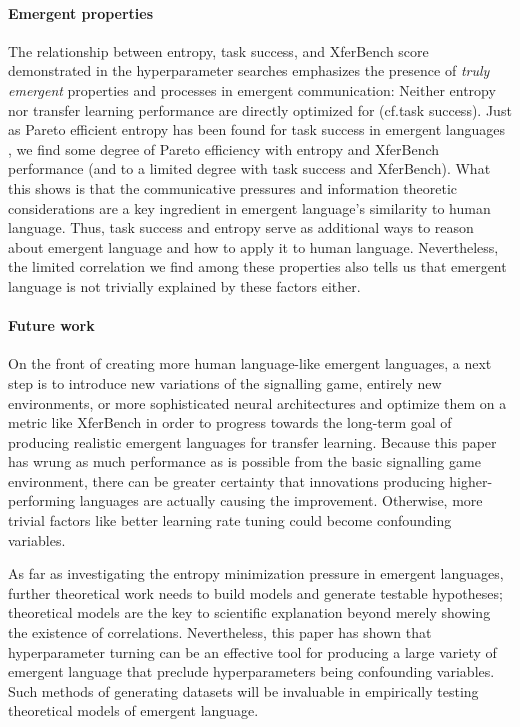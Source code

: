 \paragraph{Emergent properties}
The relationship between entropy, task success, and XferBench score demonstrated in the hyperparameter searches emphasizes the presence of \emph{truly emergent} properties and processes in emergent communication:
Neither entropy nor transfer learning performance are directly optimized for (cf.\@ task success).
Just as Pareto efficient entropy has been found for task success in emergent languages \citep{kharitonov2020entmin}, we find some degree of Pareto efficiency with entropy and XferBench performance (and to a limited degree with task success and XferBench).
What this shows is that the communicative pressures and information theoretic considerations are a key ingredient in emergent language's similarity to human language.
Thus, task success and entropy serve as additional ways to reason about emergent language and how to apply it to human language.
Nevertheless, the limited correlation we find among these properties also tells us that emergent language is not trivially explained by these factors either.


\paragraph{Future work}
On the front of creating more human language-like emergent languages, a next step is to introduce new variations of the signalling game, entirely new environments, or more sophisticated neural architectures and optimize them on a metric like XferBench in order to progress towards the long-term goal of producing realistic emergent languages for transfer learning.
Because this paper has wrung as much performance as is possible from the basic signalling game environment, there can be greater certainty that innovations producing higher-performing languages are actually causing the improvement.
Otherwise, more trivial factors like better learning rate tuning could become confounding variables.

As far as investigating the entropy minimization pressure in emergent languages, further theoretical work needs to build models and generate testable hypotheses; theoretical models are the key to scientific explanation beyond merely showing the existence of correlations.
Nevertheless, this paper has shown that hyperparameter turning can be an effective tool for producing a large variety of emergent language that preclude hyperparameters being confounding variables.
Such methods of generating datasets will be invaluable in empirically testing theoretical models of emergent language.

